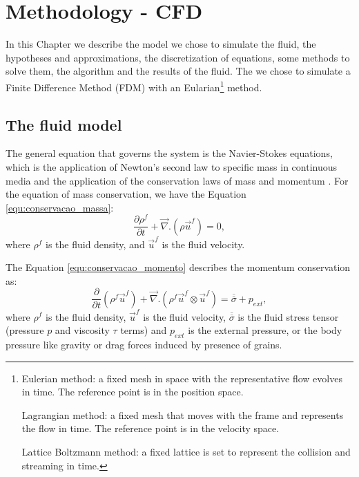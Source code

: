 \chapter{Methodology - CFD}
\label{chap:CFD}

    In this Chapter we describe the model we chose to simulate the fluid, the hypotheses and approximations, the discretization of equations, some methods to solve them, the algorithm and the results of the fluid. The we chose to simulate a Finite Difference Method (FDM) with an Eularian\footnote{
    Eulerian method: a fixed mesh in space with the representative flow evolves in time. The reference point is in the position space.

    Lagrangian method: a fixed mesh that moves with the frame and represents the flow in time. The reference point is in the velocity space.

    Lattice Boltzmann method: a fixed lattice is set to represent the collision and streaming in time.
} method.

\section{The fluid model}
    The general equation that governs the system is the Navier-Stokes equations, which is the application of Newton's second law to specific mass in continuous media and the application of the conservation laws of mass and momentum \cite{Physical_Hydrodynamics, Fluid_Mechanics}. For the equation of mass conservation, we have the Equation \ref{equ:conservacao_massa}: 
\begin{equation}
    \frac{\partial \rho^{f}}{\partial t} +\vec{\nabla}.(\rho \vec{u}^{f}) = 0,
    \label{equ:conservacao_massa}
\end{equation}
where $\rho^{f}$ is the fluid density, and $\vec{u}^{f}$ is the fluid velocity.

    The Equation \ref{equ:conservacao_momento} describes the momentum conservation as:
\begin{equation}
    \frac{\partial}{\partial t}\left(\rho^{f}\vec{u}^{f}\right) +\vec{\nabla}.\left(\rho^{f}\vec{u}^{f}\otimes\vec{u}^{f}\right) = \overline{\overline{\sigma}} +p_{ext},
    \label{equ:conservacao_momento}
\end{equation}
where $\rho^{f}$ is the fluid density, $\vec{u}^{f}$ is the fluid velocity, $\overline{\overline{\sigma}}$ is the fluid stress tensor (pressure $p$ and viscosity $\tau$ terms) and $p_{ext}$ is the external pressure, or the body pressure like gravity or drag forces induced by presence of grains.


